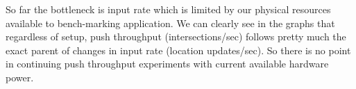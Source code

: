 \documentclass[a4]{report}
\begin{document}
    So far the bottleneck is input rate which is limited by our physical resources available to bench-marking
    application.
    We can clearly see in the graphs that regardless of setup, push throughput (intersections/sec) follows pretty
    much the exact parent of changes in input rate (location updates/sec).
    So there is no point in continuing push throughput experiments with current available hardware power.



    \nocite{*}
    
    
\end{document}
